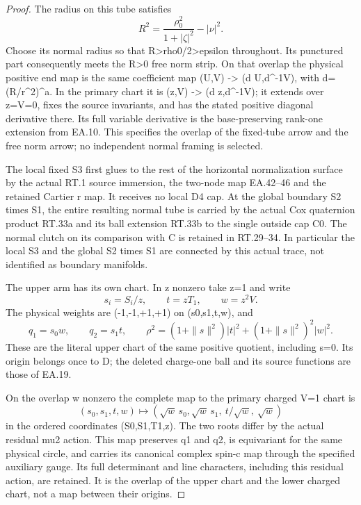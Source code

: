 \begin{proof}
The radius on this tube satisfies
\[
 R^2=\frac{\rho_0^2}{1+|\zeta|^2}-|\nu|^2 .
 \tag{P3K.80.EA.56}
\]
Choose its normal radius so that R>rho0/2>epsilon throughout.
Its punctured part consequently meets the R>0 free norm
strip. On that overlap the physical positive end map is
the same coefficient map
(U,V) -> (d U,d\textasciicircum{}{-1}V), with d=(R/r\textasciicircum{}2)\textasciicircum{}a.
In the primary chart it is
(z,V) -> (d z,d\textasciicircum{}{-1}V); it extends over z=V=0,
fixes the source invariants, and has the stated positive
diagonal derivative there. Its full variable derivative is
the base-preserving rank-one extension from EA.10. This
specifies the overlap of the fixed-tube arrow and the free
norm arrow; no independent normal framing is selected.

The local fixed S3 first glues to the rest of the horizontal
normalization surface by the actual RT.1 source immersion,
the two-node map EA.42--46 and the retained Cartier r map.
It receives no local D4 cap. At the global boundary
S2 times S1, the entire resulting normal tube is carried
by the actual Cox quaternion product RT.33a and its ball
extension RT.33b to the single outside cap C0.
The normal clutch on its comparison with C is retained in
RT.29--34. In particular the local S3 and the global
S2 times S1 are connected by this actual trace, not
identified as boundary manifolds.

The upper arm has its own chart. In z nonzero take z=1 and
write
\[
 s_i=S_i/z,\qquad t=zT_1,\qquad w=z^2V .
 \tag{P3K.80.EA.57}
\]
The physical weights are (-1,-1,+1,+1) on
(s0,s1,t,w), and
\[
 q_1=s_0w,\qquad q_2=s_1t,\qquad
 \rho^2=(1+\|s\|^2)|t|^2+(1+\|s\|^2)^2|w|^2 .
 \tag{P3K.80.EA.58}
\]
These are the literal upper chart of the same positive
quotient, including s=0. Its origin belongs once to D;
the deleted charge-one ball and its source functions are
those of EA.19.

On the overlap w nonzero the complete map to the primary
charged V=1 chart is
\[
 (s_0,s_1,t,w)\longmapsto
 (\sqrt w\,s_0,\sqrt w\,s_1,\ t/\sqrt w,\ \sqrt w)
 \tag{P3K.80.EA.59}
\]
in the ordered coordinates (S0,S1,T1,z). The two roots
differ by the actual residual mu2 action. This map preserves
q1 and q2, is equivariant for the same physical circle,
and carries its canonical complex spin-c map through the
specified auxiliary gauge. Its full determinant and line
characters, including this residual action, are retained.
It is the overlap of the upper chart and the lower charged
chart, not a map between their origins.


\end{proof}
